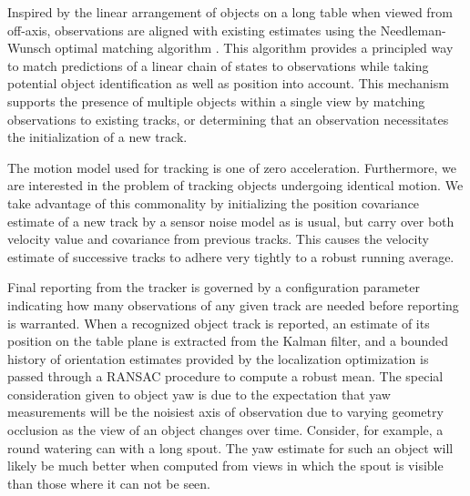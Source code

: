 \documentclass[letterpaper, 10 pt, conference]{ieeeconf}  %
\begin{document}
Inspired by the linear arrangement of objects on a long table when
viewed from off-axis, observations are aligned with existing estimates
using the Needleman-Wunsch optimal matching algorithm
\cite{NeedlemanWunsch1970}. This algorithm provides a principled way
to match predictions of a linear chain of states to observations while
taking potential object identification as well as position into
account. This mechanism supports the presence of multiple objects
within a single view by matching observations to existing tracks, or
determining that an observation necessitates the initialization of a
new track.


The motion model used for tracking is one of zero
acceleration. Furthermore, we are interested in the problem of
tracking objects undergoing identical motion. We take advantage of
this commonality by initializing the position covariance estimate of a
new track by a sensor noise model as is usual, but carry over both
velocity value and covariance from previous tracks. This causes the
velocity estimate of successive tracks to adhere very tightly to a
robust running average.

Final reporting from the tracker is governed by a configuration
parameter indicating how many observations of any given track are
needed before reporting is warranted. When a recognized object track
is reported, an estimate of its position on the table plane is
extracted from the Kalman filter, and a bounded history of orientation
estimates provided by the localization optimization is passed through
a RANSAC \cite{Fischler1981:RANSAC} procedure to compute a robust
mean. The special consideration given to object yaw is due to the
expectation that yaw measurements will be the noisiest axis of
observation due to varying geometry occlusion as the view of an object
changes over time. Consider, for example, a round watering can with a
long spout. The yaw estimate for such an object will likely be much
better when computed from views in which the spout is visible than
those where it can not be seen.
\end{document}
